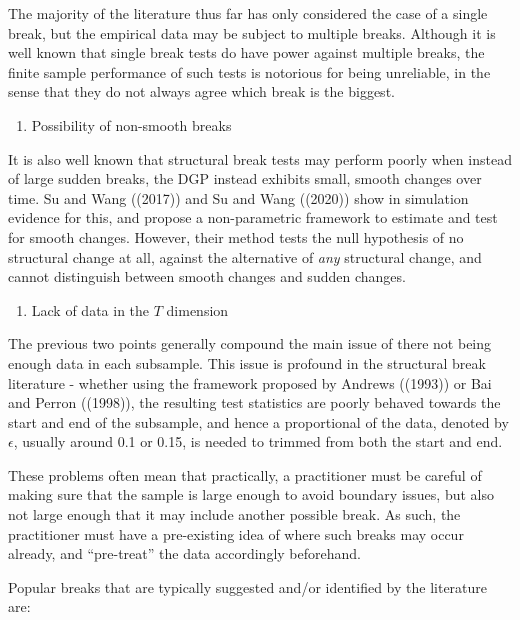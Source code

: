 \documentclass[
]{article}
\providecommand{\tightlist}{%
  \setlength{\itemsep}{0pt}\setlength{\parskip}{0pt}}
\begin{document}
The majority of the literature thus far has only considered the case of
a single break, but the empirical data may be subject to multiple
breaks. Although it is well known that single break tests do have power
against multiple breaks, the finite sample performance of such tests is
notorious for being unreliable, in the sense that they do not always
agree which break is the biggest.

\begin{enumerate}
\def\labelenumi{\arabic{enumi}.}
\setcounter{enumi}{1}
\tightlist
\item
  Possibility of non-smooth breaks
\end{enumerate}

It is also well known that structural break tests may perform poorly
when instead of large sudden breaks, the DGP instead exhibits small,
smooth changes over time. Su and Wang ((2017)) and Su and Wang ((2020))
show in simulation evidence for this, and propose a non-parametric
framework to estimate and test for smooth changes. However, their method
tests the null hypothesis of no structural change at all, against the
alternative of \emph{any} structural change, and cannot distinguish
between smooth changes and sudden changes.

\begin{enumerate}
\def\labelenumi{\arabic{enumi}.}
\setcounter{enumi}{2}
\tightlist
\item
  Lack of data in the \(T\) dimension
\end{enumerate}

The previous two points generally compound the main issue of there not
being enough data in each subsample. This issue is profound in the
structural break literature - whether using the framework proposed by
Andrews ((1993)) or Bai and Perron ((1998)), the resulting test
statistics are poorly behaved towards the start and end of the
subsample, and hence a proportional of the data, denoted by
\(\epsilon\), usually around 0.1 or 0.15, is needed to trimmed from both
the start and end.

These problems often mean that practically, a practitioner must be
careful of making sure that the sample is large enough to avoid boundary
issues, but also not large enough that it may include another possible
break. As such, the practitioner must have a pre-existing idea of where
such breaks may occur already, and ``pre-treat'' the data accordingly
beforehand.

Popular breaks that are typically suggested and/or identified by the
literature are:
\end{document}
